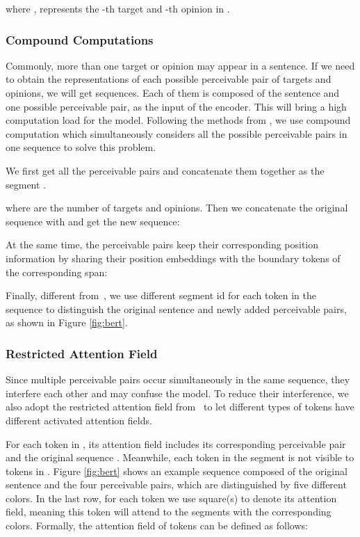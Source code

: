 \documentclass[11pt]{article}
\begin{document}
where ,  represents the -th target and -th opinion in .


\subsubsection{Compound Computations}

Commonly, more than one target or opinion may appear in a sentence. 
If we need to obtain the representations of each possible perceivable pair of targets and opinions, we will get    sequences. Each of them is composed of the sentence  and one possible perceivable pair, as the input of the encoder.
This will bring a high computation load for the model.
Following the methods from \cite{zhong2020frustratingly}, we
use compound computation which simultaneously considers all the possible perceivable pairs in one sequence to solve this problem.

We first get all the perceivable pairs   and concatenate them together as the  segment .

where  are the number of targets and opinions. Then we concatenate the original sequence  with  and get the new sequence:


At the same time, the perceivable pairs keep their corresponding position information by sharing their position embeddings with the boundary tokens of the corresponding span:


Finally, different from~\cite{zhong2020frustratingly},
we use different segment id for each token in the sequence  to distinguish the original sentence and newly added perceivable pairs, as shown in Figure \ref{fig:bert}.
\subsubsection{Restricted Attention Field}
Since multiple perceivable pairs occur simultaneously in the same sequence,
they interfere each other and may confuse the model. To reduce their interference, we also adopt the restricted attention field from~\cite{zhong2020frustratingly} to let different types of tokens have different activated attention fields.

For each token in , its attention field includes its corresponding perceivable pair and the original sequence .
Meanwhile, each token in the segment  is not visible to tokens in .  
Figure \ref{fig:bert}
shows an example sequence composed of the original sentence and the four perceivable pairs,  which are distinguished by five different colors.
In the last row, for each token we use  square(s) to denote its attention field, meaning this token will attend to the segments with the corresponding colors. 
Formally, the attention field of tokens can be defined as follows:
\end{document}
